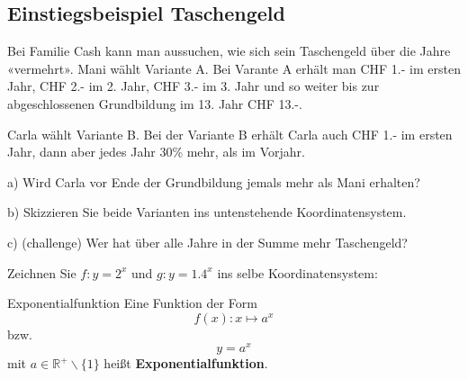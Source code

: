 

\newpage

\subsection{Einstiegsbeispiel Taschengeld}

Bei Familie Cash kann man aussuchen, wie sich sein Taschengeld über
die Jahre «vermehrt». Mani wählt Variante A. Bei Varante A erhält man
CHF 1.- im ersten Jahr, CHF 2.- im 2. Jahr, CHF 3.- im 3. Jahr und so
weiter bis zur abgeschlossenen Grundbildung im 13. Jahr CHF 13.-.

Carla wählt Variante B. Bei der Variante B erhält Carla auch CHF 1.-
im ersten Jahr, dann aber jedes Jahr 30\% mehr, als im Vorjahr.

a) Wird Carla vor Ende der Grundbildung jemals mehr als Mani erhalten?


b) Skizzieren Sie beide Varianten ins untenstehende Koordinatensystem.

c) (challenge) Wer hat über alle Jahre in der Summe mehr Taschengeld?







\newpage

Zeichnen Sie $f: y=2^x$ und $g: y=1.4^x$ ins selbe Koordinatensystem:



\begin{definition}{Exponentialfunktion}{}
  Eine Funktion der Form $$f(x): x \mapsto a^x$$
  bzw. $$y = a^x$$
  mit $a\in \mathbb{R}^{+}\backslash\{1\}$ heißt \textbf{Exponentialfunktion}.
\end{definition}


